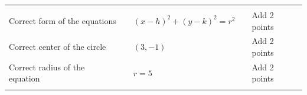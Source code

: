 {\begin{tabular}{lllll}
&&&&\\ Correct form of the equations&&$(x-h)^2+(y-k)^2=r^2$&&Add 2 points\\
Correct center of the circle&&$(3,-1)$&&Add 2 points\\
Correct radius of the equation&&$r=5$&&Add 2 points\\ &&&&\\ \end{tabular}}


